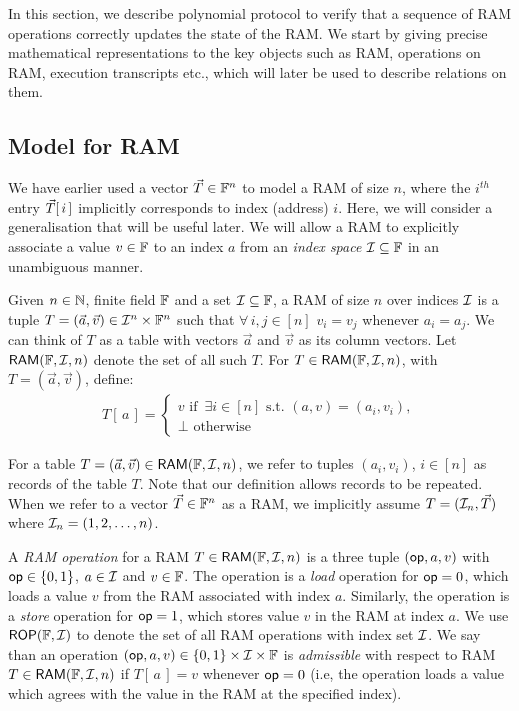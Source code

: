 In this section, we describe polynomial protocol to verify that a sequence of RAM operations
correctly updates the state of the RAM. We start by giving precise mathematical representations
to the key objects such as RAM, operations on RAM, execution transcripts etc., which will later
be used to describe relations on them.

\subsection{Model for RAM}\label{subsec:model-for-ram}
We have earlier used a vector $\vec{T}\in \mathbb{F}^n$ to model a RAM of size $n$, where the $i^{th}$ entry $\vec{T}[\,i\,]$
implicitly corresponds to index (address) $i$. Here, we will consider a generalisation that will be useful later.
We will allow a RAM to explicitly associate a value $v\in \mathbb{F}$ to an index $a$ from an {\em index space}
$\cal{I}\subseteq \mathbb{F}$ in an unambiguous manner.
\begin{definition}[RAM]\label{defn:RAM}
    Given $n\in \mathbb{N}$, finite field $\mathbb{F}$ and a set $\cal{I}\subseteq \mathbb{F}$, a RAM of size $n$ over indices $\cal{I}$
    is a tuple $T=(\vec{a},\vec{v})\in \mathcal{I}^n\times \mathbb{F}^n$ such that $\forall\, i,j\in [n]$  $v_i=v_j$ whenever $a_i=a_j$.
    We can think of $T$ as a table with vectors $\vec{a}$ and $\vec{v}$ as its column vectors. Let
    $\mathsf{RAM}(\mathbb{F}, \mathcal{I}, {n})$ denote the set of all such $T$. For $T\in \mathsf{RAM}(\mathbb{F}, \mathcal{I}, {n})$, with $T=(\vec{a},\vec{v})$, define:
    \begin{align*}
        T[\,a\,] = \begin{cases}
                       v \text{ if } \, \exists i\in [n] \text{ s.t. } (a,v) = (a_i,v_i), \\
                       \bot \text{ otherwise }
                    \end{cases}
    \end{align*}
\end{definition}
For a table $T=(\vec{a},\vec{v})\in \mathsf{RAM}(\mathbb{F}, \mathcal{I}, {n})$, we refer to tuples $(a_i,v_i)$, $i\in [n]$ as records of the table $T$.
Note that our definition allows records to be repeated. When we refer to a vector $\vec{T}\in \mathbb{F}^n$ as a RAM, we implicitly
assume $T=(\mathcal{I}_n,\vec{T})$ where $\mathcal{I}_n=(1,2,\ldots,n)$.

A {\em RAM operation} for a RAM $T\in \mathsf{RAM}(\mathbb{F}, \mathcal{I}, {n})$ is a three tuple $(\mathsf{op},a,v)$ with $\mathsf{op}\in \{0,1\}$,
$a\in \mathcal{I}$ and $v\in \mathbb{F}$. The operation is a {\em load} operation for $\mathsf{op}=0$, which loads a value $v$
from the RAM associated with index $a$. Similarly, the operation is a {\em store} operation for $\mathsf{op}=1$,
which stores value $v$ in the RAM at index $a$. We use
$\mathsf{ROP}(\mathbb{F}, \mathcal{I})$ to denote the set of all RAM operations with index set $\mathcal{I}$. We say than an operation
$(\mathsf{op},a,v)\in \{0,1\}\times \mathcal{I}\times \mathbb{F}$ is {\em admissible} with respect to RAM $T\in \mathsf{RAM}(\mathbb{F}, \mathcal{I}, {n})$ if
$T[\,a\,]=v$ whenever $\mathsf{op}=0$ (i.e, the operation loads a value which agrees with the value in the RAM at the specified index).

